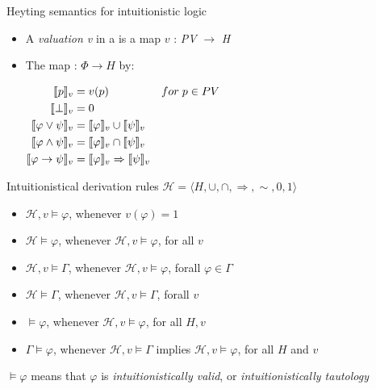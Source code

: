 \documentclass[sans]{beamer}
\begin{document}
\begin{frame}{Heyting semantics for intuitionistic logic}
  \begin{itemize}
    \item A \emph{valuation v} in a  is a map $v$ : \emph{PV} $\to$ \emph{H}
    \item The map \vmsem{\bullet} : $\Phi \to H$ by:

      $\begin{aligned}
        \llbracket p \rrbracket_v &= v(p) & for \; p \in PV \\
        \llbracket \bot \rrbracket_v &= 0 \\
        \llbracket \varphi \vee \psi \rrbracket_v &= \llbracket \varphi \rrbracket_v \cup \llbracket \psi \rrbracket_v \\
        \llbracket \varphi \wedge \psi \rrbracket_v &= \llbracket \varphi \rrbracket_v \cap \llbracket \psi \rrbracket_v\\
        \llbracket \varphi \to \psi \rrbracket_v &= \llbracket \varphi \rrbracket_v \Rightarrow \llbracket \psi \rrbracket_v
       \end{aligned}$
  \end{itemize}
\end{frame}


\newcommand{\calh}{\cali{H}}
\newcommand{\mcalh}{\mathcal{H}}

\begin{frame}{Intuitionistical derivation rules}
  $\mathcal{H} = \langle H, \cup, \cap, \Rightarrow, {\sim}, 0, 1 \rangle$
  \begin{itemize}
    \item $\mcalh, v \models \varphi$, whenever $v(\varphi) = 1$
    \item $\mcalh \models \varphi$, whenever $\mcalh, v \models \varphi$, for all $v$
    \item $\mcalh, v \models \Gamma$, whenever $\mcalh, v \models \varphi$, forall $\varphi \in \Gamma$
    \item $\mcalh \models \Gamma$, whenever $\mcalh, v \models \Gamma$, forall $v$
    \item $\models \varphi$, whenever $\mcalh, v \models \varphi$, for all $H, v$
    \item $\Gamma \models \varphi$, whenever $\mcalh, v \models \Gamma$ implies $\mcalh, v \models \varphi$, for all $H$ and $v$
  \end{itemize}

  \vfill
  $\models \varphi$ means that $\varphi$ is \emph{intuitionistically valid}, or \emph{intuitionistically tautology}

\end{frame}
\end{document}
